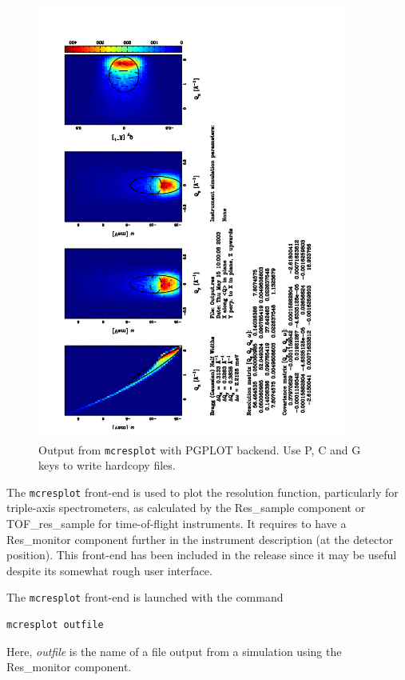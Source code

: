 \begin{figure}[htb!]
  \begin{center}
    \includegraphics[angle=-90,width=0.9\textwidth]{figures/mcresplot_PGPLOT}
  \end{center}
\caption{Output from \texttt{mcresplot} with PGPLOT backend.
  Use P, C and G keys to write hardcopy files.}
\label{fig:mcresplot_PGPLOT}
\end{figure}

The \verb+mcresplot+ front-end is used to plot the resolution function,
particularly for triple-axis
spectrometers, as calculated by the Res\_sample component or TOF\_res\_sample
for time-of-flight instruments. It requires to have a Res\_monitor component
further in the instrument description (at the detector position).
This front-end
has been included in the release since it may be useful
despite its somewhat rough user interface.

The \verb+mcresplot+ front-end is launched with the command
\begin{lstlisting}
mcresplot outfile
\end{lstlisting}
Here, {\it outfile\/} is the name of a file output from a simulation using
the Res\_monitor component.

